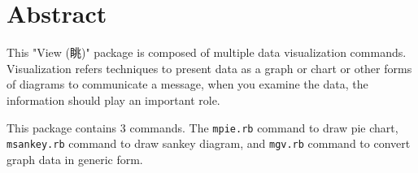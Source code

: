 

\section{Abstract}

This "View (眺)" package is composed of multiple data visualization commands.
Visualization refers techniques to present data as a graph or chart or other forms of diagrams to communicate a message,
when you examine the data, the information should play an important role. 

This package contains 3 commands. The \verb|mpie.rb| command to draw pie chart, 
\verb|msankey.rb| command to draw sankey diagram, 
and \verb|mgv.rb| command to convert graph data in generic form. 





